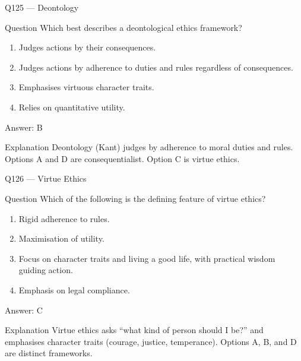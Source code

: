 \documentclass[aspectratio=169,8pt]{beamer}
\begin{document}
\begin{frame}{Q125 --- Deontology}
\begin{block}{Question}
Which best describes a deontological ethics framework?
\begin{enumerate}
\item Judges actions by their consequences.
\item Judges actions by adherence to duties and rules regardless of consequences.
\item Emphasises virtuous character traits.
\item Relies on quantitative utility.
\end{enumerate}
	\end{block}
\begin{exampleblock}{Answer: B}\end{exampleblock}
\begin{block}{Explanation}
Deontology (Kant) judges by adherence to moral duties and rules. Options A and D are consequentialist. Option C is virtue ethics.
\end{block}
\end{frame}

\begin{frame}{Q126 --- Virtue Ethics}
\begin{block}{Question}
Which of the following is the defining feature of virtue ethics?
\begin{enumerate}
\item Rigid adherence to rules.
\item Maximisation of utility.
\item Focus on character traits and living a good life, with practical wisdom guiding action.
\item Emphasis on legal compliance.
\end{enumerate}
	\end{block}
\begin{exampleblock}{Answer: C}\end{exampleblock}
\begin{block}{Explanation}
Virtue ethics asks ``what kind of person should I be?'' and emphasises character traits (courage, justice, temperance). Options A, B, and D are distinct frameworks.
\end{block}
\end{frame}
\end{document}
